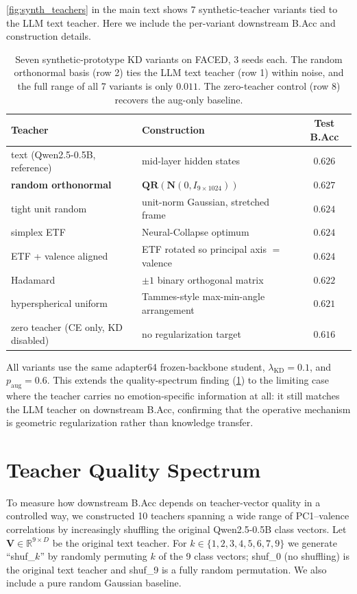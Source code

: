 \cref{fig:synth_teachers} in the main text shows 7 synthetic-teacher variants tied to the LLM text teacher. Here we include the per-variant downstream B.Acc and construction details.

\begin{table}[!h]
\caption{Seven synthetic-prototype KD variants on FACED, 3 seeds each. The random orthonormal basis (row 2) ties the LLM text teacher (row 1) within noise, and the full range of all 7 variants is only $0.011$. The zero-teacher control (row 8) recovers the aug-only baseline.}
\small
\centering
\begin{tabular}{llc}
\toprule
Teacher & Construction & Test B.Acc \\
\midrule
text (Qwen2.5-0.5B, reference) & mid-layer hidden states & $0.626$ \\
\textbf{random orthonormal} & $\mathbf{QR}(\mathbf{N}(0, I_{9 \times 1024}))$ & $\mathbf{0.627}$ \\
tight unit random & unit-norm Gaussian, stretched frame & $0.624$ \\
simplex ETF~\cite{papyan2020neural} & Neural-Collapse optimum & $0.624$ \\
ETF + valence aligned & ETF rotated so principal axis $=$ valence & $0.624$ \\
Hadamard & $\pm 1$ binary orthogonal matrix & $0.622$ \\
hyperspherical uniform & Tammes-style max-min-angle arrangement & $0.621$ \\
zero teacher (CE only, KD disabled) & no regularization target & $0.616$ \\
\bottomrule
\end{tabular}
\label{tab:supp_synth_teachers}
\end{table}

All variants use the same adapter64 frozen-backbone student, $\lambda_{\text{KD}} = 0.1$, and $p_{\text{aug}} = 0.6$. This extends the quality-spectrum finding (\cref{sec:supp_qspec}) to the limiting case where the teacher carries no emotion-specific information at all: it still matches the LLM teacher on downstream B.Acc, confirming that the operative mechanism is geometric regularization rather than knowledge transfer.

\section{Teacher Quality Spectrum}
\label{sec:supp_qspec}

To measure how downstream B.Acc depends on teacher-vector quality in a controlled way, we constructed 10 teachers spanning a wide range of PC1--valence correlations by increasingly shuffling the original Qwen2.5-0.5B class vectors. Let $\mathbf{V} \in \mathbb{R}^{9 \times D}$ be the original text teacher. For $k \in \{1, 2, 3, 4, 5, 6, 7, 9\}$ we generate ``shuf\_$k$'' by randomly permuting $k$ of the 9 class vectors; shuf\_0 (no shuffling) is the original text teacher and shuf\_9 is a fully random permutation. We also include a pure random Gaussian baseline.

